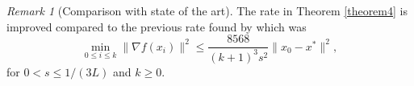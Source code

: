 \documentclass{article}
\theoremstyle{plain}
\theoremstyle{definition}
\theoremstyle{remark}
\newtheorem{remark}{Remark}[theorem]
\begin{document}
\begin{remark}[Comparison with state of the art]
    The rate in Theorem \ref{theorem4} is improved compared to the previous rate found by \citep{Shi2021UnderstandingTA} which was 
$$ \min_{0\leq i\leq k}\|\nabla f(x_i)\|^2 \leq \frac{8568}{(k+1)^3s^2}\|x_0-x^*\|^2,$$
for $0< s\leq 1/(3L)$ and $k\geq0$.
\end{remark}
\end{document}
